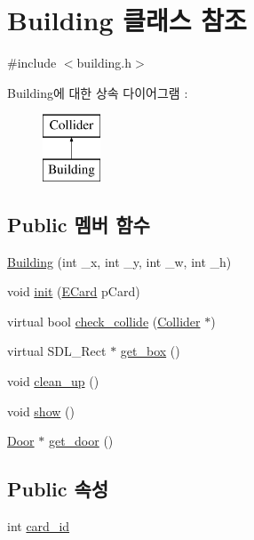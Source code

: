 \hypertarget{class_building}{\section{\-Building 클래스 참조}
\label{class_building}
}


{\ttfamily \#include $<$building.\-h$>$}

\-Building에 대한 상속 다이어그램 \-: \begin{figure}[H]
\begin{center}
\leavevmode
\includegraphics[height=2.000000cm]{class_building}
\end{center}
\end{figure}
\subsection*{\-Public 멤버 함수}
\begin{DoxyCompactItemize}
\item 
\hyperlink{class_building_a3196128a859083cc124e4e783f2abfe2}{\-Building} (int \-\_\-x, int \-\_\-y, int \-\_\-w, int \-\_\-h)
\item 
void \hyperlink{class_building_ada54cf04765575df590b78a7df573395}{init} (\hyperlink{_constants_8h_a03f7ec9e12b891db1bbeda07eb4099d7}{\-E\-Card} p\-Card)
\item 
virtual bool \hyperlink{class_building_a02c1ac48410c20319a30e6ce13433212}{check\-\_\-collide} (\hyperlink{class_collider}{\-Collider} $\ast$)
\item 
virtual \-S\-D\-L\-\_\-\-Rect $\ast$ \hyperlink{class_building_abb1a4ea20e451db134810c45d530e19f}{get\-\_\-box} ()
\item 
void \hyperlink{class_building_adb755e094e0017cc0834dbaa81f08888}{clean\-\_\-up} ()
\item 
void \hyperlink{class_building_a4cb46a187a9c0d9d4bb68c5e8d8a801a}{show} ()
\item 
\hyperlink{class_door}{\-Door} $\ast$ \hyperlink{class_building_a422d693cd9f6ba552a7abba9c0f7f22b}{get\-\_\-door} ()
\end{DoxyCompactItemize}
\subsection*{\-Public 속성}
\begin{DoxyCompactItemize}
\item 
int \hyperlink{class_building_a853be442e19c87017130550963def9ff}{card\-\_\-id}
\end{DoxyCompactItemize}


